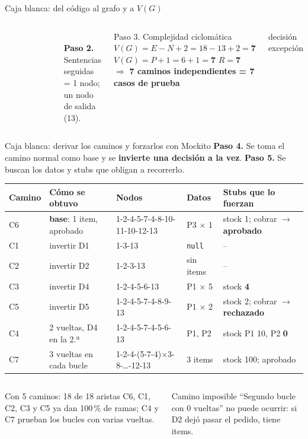 \documentclass[aspectratio=169,10pt]{beamer}
\newcommand{\code}[1]{\texttt{#1}}
\begin{document}
\begin{frame}{Caja blanca: del código al grafo y a $V(G)$}
\begin{columns}[c]
\begin{tabular}{@{}lll@{}}
\bottomrule
\end{tabular}\\[3pt]
\textbf{Paso 2.} Sentencias seguidas = 1 nodo; un nodo de salida (13).\\[3pt]
\begin{block}{Paso 3. Complejidad ciclomática}
\scriptsize $V(G) = E - N + 2 = 18 - 13 + 2 = \mathbf{7}$ \quad $V(G) = P + 1 = 6 + 1 = \mathbf{7}$ \quad $R = \mathbf{7}$\\
$\Rightarrow$ \textbf{7 caminos independientes = 7 casos de prueba}
\end{block}
\tiny \textcolor{anot}{\faCircle} decisión \quad \textcolor{acento}{\faCircle} excepción
\end{columns}
\end{frame}

\begin{frame}{Caja blanca: derivar los caminos y forzarlos con Mockito}
\scriptsize \textbf{Paso 4.} Se toma el camino normal como base y se \textbf{invierte una decisión a la vez}. \textbf{Paso 5.} Se buscan los datos y stubs que obligan a recorrerlo.\\[3pt]
\setlength{\tabcolsep}{4pt}
\begin{tabular}{@{}lllll@{}}
\toprule
\textbf{Camino} & \textbf{Cómo se obtuvo} & \textbf{Nodos} & \textbf{Datos} & \textbf{Stubs que lo fuerzan}\\
\midrule
C6 & \textbf{base}: 1 item, aprobado & 1-2-4-5-7-4-8-10-11-10-12-13 & P3 $\times$ 1 & stock 1; cobrar $\rightarrow$ \textbf{aprobado}\\
C1 & invertir D1 & 1-3-13 & \code{null} & --\\
C2 & invertir D2 & 1-2-3-13 & sin items & --\\
C3 & invertir D4 & 1-2-4-5-6-13 & P1 $\times$ 5 & stock \textbf{4}\\
C5 & invertir D5 & 1-2-4-5-7-4-8-9-13 & P1 $\times$ 2 & stock 2; cobrar $\rightarrow$ \textbf{rechazado}\\
C4 & 2 vueltas, D4 en la 2.ª & 1-2-4-5-7-4-5-6-13 & P1, P2 & stock P1 10, P2 \textbf{0}\\
C7 & 3 vueltas en cada bucle & 1-2-4-(5-7-4)$\times$3-8-\ldots-12-13 & 3 items & stock 100; aprobado\\
\bottomrule
\end{tabular}

\vspace{0.3cm}
\begin{columns}[T]
\begin{exampleblock}{Con 5 caminos: 18 de 18 aristas}
\scriptsize C6, C1, C2, C3 y C5 ya dan 100\,\% de ramas; C4 y C7 prueban los bucles con varias vueltas.
\end{exampleblock}
\begin{alertblock}{Camino imposible}
\scriptsize ``Segundo bucle con 0 vueltas'' no puede ocurrir: si D2 dejó pasar el pedido, tiene items.
\end{alertblock}
\end{columns}
\end{frame}
\end{document}
